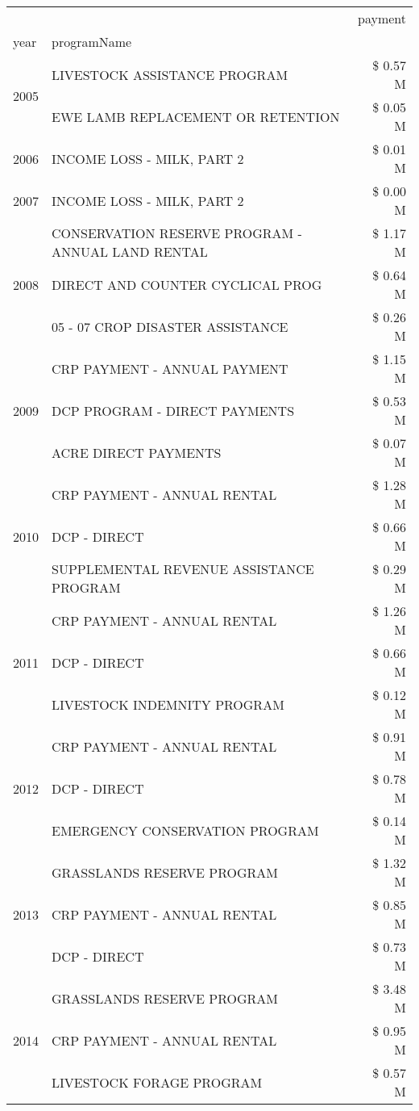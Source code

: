 \begin{tabular}{llr}
\toprule
 &  & payment \\
year & programName &  \\
\midrule
\multirow[t]{2}{*}{2005} & LIVESTOCK ASSISTANCE PROGRAM & \$ 0.57 M \\
 & EWE LAMB REPLACEMENT OR RETENTION & \$ 0.05 M \\
\cline{1-3}
2006 & INCOME LOSS - MILK, PART 2 & \$ 0.01 M \\
\cline{1-3}
2007 & INCOME LOSS - MILK, PART 2 & \$ 0.00 M \\
\cline{1-3}
\multirow[t]{3}{*}{2008} & CONSERVATION RESERVE PROGRAM - ANNUAL LAND RENTAL & \$ 1.17 M \\
 & DIRECT AND COUNTER CYCLICAL PROG & \$ 0.64 M \\
 & 05 - 07 CROP DISASTER ASSISTANCE & \$ 0.26 M \\
\cline{1-3}
\multirow[t]{3}{*}{2009} & CRP PAYMENT - ANNUAL PAYMENT & \$ 1.15 M \\
 & DCP PROGRAM - DIRECT PAYMENTS & \$ 0.53 M \\
 & ACRE DIRECT PAYMENTS & \$ 0.07 M \\
\cline{1-3}
\multirow[t]{3}{*}{2010} & CRP PAYMENT - ANNUAL RENTAL & \$ 1.28 M \\
 & DCP - DIRECT & \$ 0.66 M \\
 & SUPPLEMENTAL REVENUE ASSISTANCE PROGRAM & \$ 0.29 M \\
\cline{1-3}
\multirow[t]{3}{*}{2011} & CRP PAYMENT - ANNUAL RENTAL & \$ 1.26 M \\
 & DCP - DIRECT & \$ 0.66 M \\
 & LIVESTOCK INDEMNITY PROGRAM & \$ 0.12 M \\
\cline{1-3}
\multirow[t]{3}{*}{2012} & CRP PAYMENT - ANNUAL RENTAL & \$ 0.91 M \\
 & DCP - DIRECT & \$ 0.78 M \\
 & EMERGENCY CONSERVATION PROGRAM & \$ 0.14 M \\
\cline{1-3}
\multirow[t]{3}{*}{2013} & GRASSLANDS RESERVE PROGRAM & \$ 1.32 M \\
 & CRP PAYMENT - ANNUAL RENTAL & \$ 0.85 M \\
 & DCP - DIRECT & \$ 0.73 M \\
\cline{1-3}
\multirow[t]{3}{*}{2014} & GRASSLANDS RESERVE PROGRAM & \$ 3.48 M \\
 & CRP PAYMENT - ANNUAL RENTAL & \$ 0.95 M \\
 & LIVESTOCK FORAGE PROGRAM & \$ 0.57 M \\

\end{tabular}
